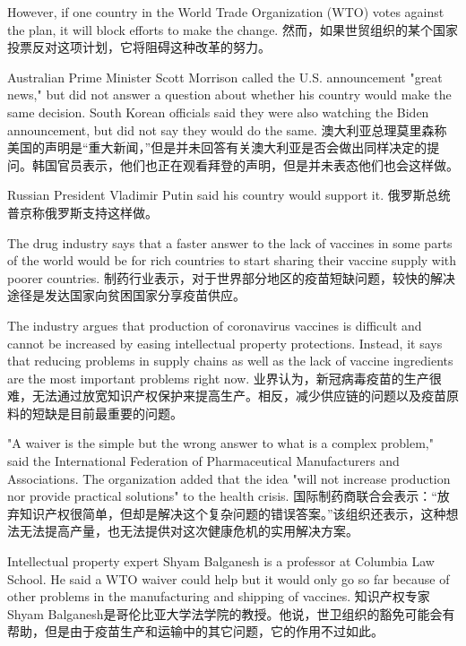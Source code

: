 However, if one country in the World Trade Organization (WTO) votes against the plan, it will block efforts to make the change.
然而，如果世贸组织的某个国家投票反对这项计划，它将阻碍这种改革的努力。

Australian Prime Minister Scott Morrison called the U.S. announcement "great news," but did not answer a question about whether his country would make the same decision. South Korean officials said they were also watching the Biden announcement, but did not say they would do the same.
澳大利亚总理莫里森称美国的声明是“重大新闻，”但是并未回答有关澳大利亚是否会做出同样决定的提问。韩国官员表示，他们也正在观看拜登的声明，但是并未表态他们也会这样做。

Russian President Vladimir Putin said his country would support it.
俄罗斯总统普京称俄罗斯支持这样做。

The drug industry says that a faster answer to the lack of vaccines in some parts of the world would be for rich countries to start sharing their vaccine supply with poorer countries.
制药行业表示，对于世界部分地区的疫苗短缺问题，较快的解决途径是发达国家向贫困国家分享疫苗供应。

The industry argues that production of coronavirus vaccines is difficult and cannot be increased by easing intellectual property protections. Instead, it says that reducing problems in supply chains as well as the lack of vaccine ingredients are the most important problems right now.
业界认为，新冠病毒疫苗的生产很难，无法通过放宽知识产权保护来提高生产。相反，减少供应链的问题以及疫苗原料的短缺是目前最重要的问题。

"A waiver is the simple but the wrong answer to what is a complex problem," said the International Federation of Pharmaceutical Manufacturers and Associations. The organization added that the idea "will not increase production nor provide practical solutions" to the health crisis.
国际制药商联合会表示：“放弃知识产权很简单，但却是解决这个复杂问题的错误答案。”该组织还表示，这种想法无法提高产量，也无法提供对这次健康危机的实用解决方案。

Intellectual property expert Shyam Balganesh is a professor at Columbia Law School. He said a WTO waiver could help but it would only go so far because of other problems in the manufacturing and shipping of vaccines.
知识产权专家Shyam Balganesh是哥伦比亚大学法学院的教授。他说，世卫组织的豁免可能会有帮助，但是由于疫苗生产和运输中的其它问题，它的作用不过如此。
